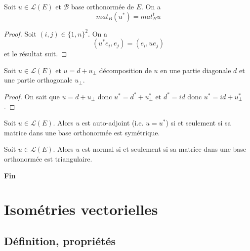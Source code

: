 \begin{proposition}
\label{prop:2}

Soit $u \in \mathcal{L}(E)$ et $\mathcal{B}$ base orthonormée de $E$. On a
\[ mat_{B}(u^*) = mat_{B}^t u \]
\end{proposition}

\begin{proof}

Soit $(i,j) \in \{1, n\}^2$. On a
\[ (u^*e_i, e_j) = (e_i, ue_j) \]
et le résultat suit.

\end{proof}

\begin{proposition}
\label{prop:3}

Soit $u \in \mathcal{L}(E)$ et $u = d + u_{\perp}$ décomposition de $u$ en une partie diagonale $d$ et une partie orthogonale $u_{\perp}$.
\end{proposition}

\begin{proof}

On sait que $u = d + u_{\perp}$ donc $u^* = d^* + u_{\perp}^*$ et $d^* = id$ donc $u^* = id + u_{\perp}^*$.

\end{proof}

\begin{proposition}
\label{prop:4}

Soit $u \in \mathcal{L}(E)$. Alors $u$ est auto-adjoint (i.e. $u = u^*$) si et seulement si sa matrice dans une base orthonormée est symétrique.

\end{proposition}

\begin{proposition}
\label{prop:5}

Soit $u \in \mathcal{L}(E)$. Alors $u$ est normal si et seulement si sa matrice dans une base orthonormée est triangulaire.

\textbf{Fin}


\end{proposition}

\section{Isométries vectorielles}

\subsection{Définition, propriétés}


